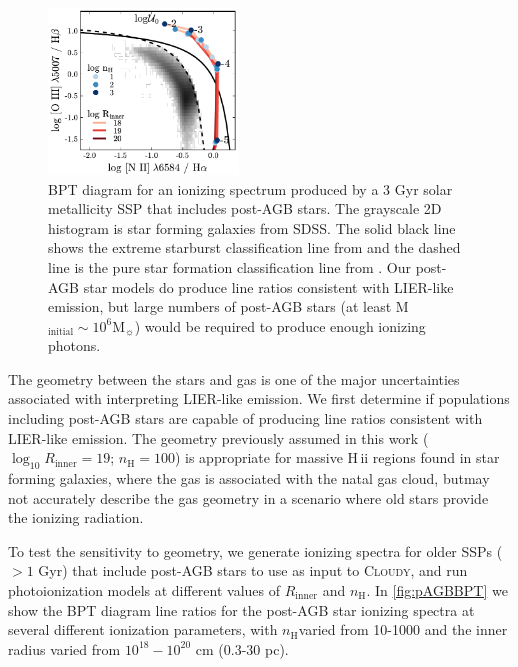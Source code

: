 \documentclass[linenumbers, trackchanges, tighten]{aastex61}%
\newcommand{\Fig}[1]{\autoref{fig:#1}}
\newcommand{\Cloudy}{\textsc{Cloudy}\xspace}
\newcommand{\logten}{\ensuremath{\log_{10}}}
\newcommand\Msun{\ensuremath{\mathrm{M_{\sun}}}}
\newcommand{\hii}{H\,{\sc ii}\xspace}
\newcommand{\nH}{\ensuremath{n_{\mathrm{H}}}}
\newcommand{\Rin}{\ensuremath{R_{\mathrm{inner}}}}
\newcommand{\logR}{\ensuremath{\logten R_{\mathrm{inner}}}}
\begin{document}
\begin{figure}[!htbp]
  \begin{centering}
    \includegraphics[width=0.45\textwidth]{f27.pdf}
    \caption{BPT diagram for an ionizing spectrum produced by a 3 Gyr solar metallicity SSP that includes post-AGB stars. The grayscale 2D histogram is star forming galaxies from SDSS. The solid black line shows the extreme starburst classification line from \citet{Kewley01} and the dashed line is the pure star formation classification line from \citet{Kauffmann03a}. Our post-AGB star models do produce line ratios consistent with LIER-like emission, but large numbers of post-AGB stars (at least M$_{\mathrm{initial}} \sim 10^6\Msun{}$) would be required to produce enough ionizing photons.}
    \label{fig:pAGBBPT}
  \end{centering}
\end{figure}

The geometry between the stars and gas is one of the major uncertainties associated with interpreting LIER-like emission. We first determine if populations including post-AGB stars are capable of producing line ratios consistent with LIER-like emission. The geometry previously assumed in this work ($\logR = 19$; $\nH = 100$) is appropriate for massive \hii regions found in star forming galaxies, where the gas is associated with the natal gas cloud, butmay not accurately describe the gas geometry in a scenario where old stars provide the ionizing radiation.

To test the sensitivity to geometry, we generate ionizing spectra for older SSPs ($>1$ Gyr) that include post-AGB stars to use as input to \Cloudy, and run photoionization models at different values of \Rin{} and \nH{}. In \Fig{pAGBBPT} we show the BPT diagram line ratios for the post-AGB star ionizing spectra at several different ionization parameters, with \nH varied from 10-1000 and the inner radius varied from $10^{18}-10^{20}$ cm (0.3-30 pc). 
\end{document}
